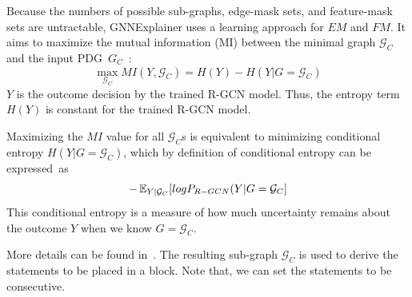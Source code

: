 
Because the numbers of possible sub-graphs, edge-mask sets, and
feature-mask sets are untractable, GNNExplainer uses a learning
approach for $EM$ and $FM$. It aims to maximize the mutual information
(MI) between the minimal graph $\mathcal{G}_C$ and the input
PDG~$G_C$~\cite{GNNExplainer}:
\begin{equation}\label{maineq}
\max_{\mathcal{G}_C} MI(Y,\mathcal{G}_C) = H(Y) - H(Y|G=\mathcal{G}_C)
\end{equation}
$Y$ is the outcome decision by the trained R-GCN model. Thus, the
entropy term $H(Y)$ is constant for the trained R-GCN
model.

Maximizing the $MI$ value for all $\mathcal{G}_C$s is equivalent
to minimizing conditional entropy $H(Y|G=\mathcal{G}_C)$, which by
definition of conditional entropy can be expressed~as
\begin{equation}
  \label{eq2}
-\operatorname{\mathbb{E}}_{Y|\mathcal{G}_C}
  [log P_{R-GCN} (Y|G=\mathcal{G}_C]
\end{equation}
This conditional entropy is a measure of how
much uncertainty remains about the outcome $Y$ when we know
$G=\mathcal{G}_C$.
%
%

More details can be found in~\cite{GNNExplainer}. The resulting
sub-graph $\mathcal{G}_C$ is used to derive the statements to be
placed in a  block. Note that, we can set the
statements to be consecutive.
